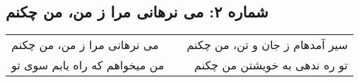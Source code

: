 \begin{center}
\section*{شماره ۲: می نرهانی مرا ز من، من چکنم}
\label{sec:002}
\begin{longtable}{l p{0.5cm} r}
می نرهانی مرا ز من، من چکنم
&&
سیر آمدهام ز جان و تن، من چکنم
\\
من میخواهم که راه یابم سوی تو
&&
تو ره ندهی به خویشتن من چکنم
\\
\end{longtable}
\end{center}
